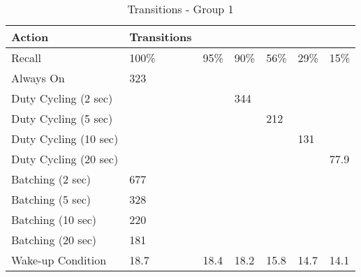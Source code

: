 \begin{table*}[t]
    \begin{tabular}{|l|l|l|l|l|l|l|}
    \hline
    Action                & Transitions & ~    & ~    & ~    & ~    & ~    \\ \hline
    Recall                & 100\%       & 95\% & 90\% & 56\% & 29\% & 15\% \\ \hline
    Always On             & 323         & ~    & ~    & ~    & ~    & ~    \\ \hline
    Duty Cycling (2 sec)  & ~           & ~    & 344  & ~    & ~    & ~    \\ \hline
    Duty Cycling (5 sec)  & ~           & ~    & ~    & 212  & ~    & ~    \\ \hline
    Duty Cycling (10 sec) & ~           & ~    & ~    & ~    & 131  & ~    \\ \hline
    Duty Cycling (20 sec) & ~           & ~    & ~    & ~    & ~    & 77.9 \\ \hline
    Batching (2 sec)      & 677         & ~    & ~    & ~    & ~    & ~    \\ \hline
    Batching (5 sec)      & 328         & ~    & ~    & ~    & ~    & ~    \\ \hline
    Batching (10 sec)     & 220         & ~    & ~    & ~    & ~    & ~    \\ \hline
    Batching (20 sec)     & 181         & ~    & ~    & ~    & ~    & ~    \\ \hline
    Wake-up Condition     & 18.7        & 18.4 & 18.2 & 15.8 & 14.7 & 14.1 \\ \hline
    \end{tabular}
	\caption{Transitions - Group 1}
	\label{table:powerProfileNexus}
\end{table*}

